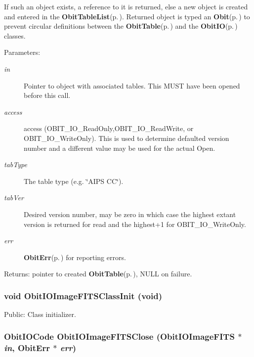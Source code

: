 If such an object exists, a reference to it is returned, else a new object is created and entered in the {\bf Obit\-Table\-List}{\rm (p.\,\pageref{structObitTableList})}. Returned object is typed an {\bf Obit}{\rm (p.\,\pageref{structObit})} to prevent circular definitions between the {\bf Obit\-Table}{\rm (p.\,\pageref{structObitTable})} and the {\bf Obit\-IO}{\rm (p.\,\pageref{structObitIO})} classes. \begin{Desc}
\item[Parameters:]
\begin{description}
\item[{\em in}]Pointer to object with associated tables. This MUST have been opened before this call. \item[{\em access}]access (OBIT\_\-IO\_\-Read\-Only,OBIT\_\-IO\_\-Read\-Write, or OBIT\_\-IO\_\-Write\-Only). This is used to determine defaulted version number and a different value may be used for the actual Open. \item[{\em tab\-Type}]The table type (e.g. \char`\"{}AIPS CC\char`\"{}). \item[{\em tab\-Ver}]Desired version number, may be zero in which case the highest extant version is returned for read and the highest+1 for OBIT\_\-IO\_\-Write\-Only. \item[{\em err}]{\bf Obit\-Err}{\rm (p.\,\pageref{structObitErr})} for reporting errors. \end{description}
\end{Desc}
\begin{Desc}
\item[Returns:]pointer to created {\bf Obit\-Table}{\rm (p.\,\pageref{structObitTable})}, NULL on failure. \end{Desc}
\subsubsection{\setlength{\rightskip}{0pt plus 5cm}void Obit\-IOImage\-FITSClass\-Init (void)}\label{ObitIOImageFITS_8h_a3}


Public: Class initializer. 

\subsubsection{\setlength{\rightskip}{0pt plus 5cm}Obit\-IOCode Obit\-IOImage\-FITSClose ({\bf Obit\-IOImage\-FITS} $\ast$ {\em in}, {\bf Obit\-Err} $\ast$ {\em err})}\label{ObitIOImageFITS_8h_a12}


